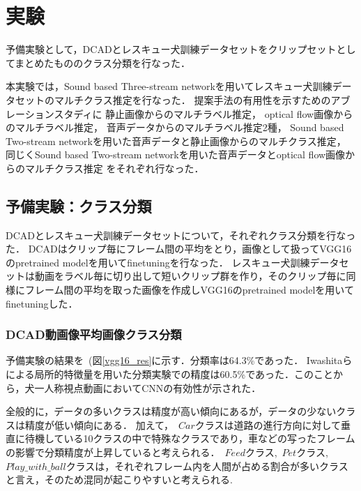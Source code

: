 \chapter{実験}
予備実験として，DCADとレスキュー犬訓練データセットをクリップセットとしてまとめたもののクラス分類を行なった．

本実験では，Sound based Three-stream networkを用いてレスキュー犬訓練データセットのマルチクラス推定を行なった．
提案手法の有用性を示すためのアブレーションスタディに
静止画像からのマルチラベル推定，
optical flow画像からのマルチラベル推定，
音声データからのマルチラベル推定2種，
Sound based Two-stream networkを用いた音声データと静止画像からのマルチクラス推定，
同じくSound based Two-stream networkを用いた音声データとoptical flow画像からのマルチクラス推定
をそれぞれ行なった．
\section{予備実験：クラス分類}
DCADとレスキュー犬訓練データセットについて，それぞれクラス分類を行なった．
DCADはクリップ毎にフレーム間の平均をとり，画像として扱ってVGG16のpretrained modelを用いてfinetuningを行なった．
レスキュー犬訓練データセットは動画をラベル毎に切り出して短いクリップ群を作り，そのクリップ毎に同様にフレーム間の平均を取った画像を作成しVGG16のpretrained modelを用いてfinetuningした．
\subsection{DCAD動画像平均画像クラス分類}
予備実験の結果を~(図\ref{vgg16_res}に示す．分類率は64.3\%であった．
Iwashitaらによる局所的特徴量を用いた分類実験での精度は60.5\%であった．このことから，犬一人称視点動画においてCNNの有効性が示された．

全般的に，データの多いクラスは精度が高い傾向にあるが，データの少ないクラスは精度が低い傾向にある．
加えて，~\(Car\)クラスは道路の進行方向に対して垂直に待機している10クラスの中で特殊なクラスであり，車などの写ったフレームの影響で分類精度が上昇していると考えられる．~\(Feed\)クラス,~\(Pet\)クラス,~\(Play\_with\_ball\)クラスは，それぞれフレーム内を人間が占める割合が多いクラスと言え，そのため混同が起こりやすいと考えられる.

